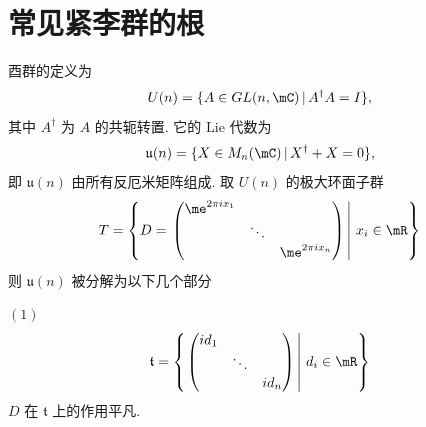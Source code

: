 \section{常见紧李群的根}
\begin{example}[酉群 $U(n)$]
    酉群的定义为
    \begin{equation*}
        U(n) = \{A\in GL(n,\mC)\,|\,A^\dagger A=I\},
    \end{equation*}
    其中 $A^\dagger$ 为 $A$ 的共轭转置. 
    它的 $\mathrm{Lie}$ 代数为
    \begin{equation*}
        \mathfrak{u}(n) = \{X\in M_{n}(\mC)\,|\,X^\dagger + X = 0\},
    \end{equation*}
    即 $\mathfrak{u}(n)$ 由所有反厄米矩阵组成.
    取 $U(n)$ 的极大环面子群
    \begin{equation*}
        T = 
        \left\{
            D = \left.
            \begin{pmatrix}
                \me^{2\pi i x_1} & & \\
                & \ddots & \\
                & & \me^{2\pi i x_n}
            \end{pmatrix} \,\right|\, x_i\in\mR
        \right\}
    \end{equation*}
    则 $\mathfrak{u}(n)$ 被分解为以下几个部分

    \noindent $(1)$ 
    \begin{equation*}
        \mathfrak{t} = 
        \left\{
            \left.
            \begin{pmatrix}
                i d_1 & & \\
                & \ddots & \\
                & & i d_n
            \end{pmatrix} \,\right|\, d_i\in\mR
        \right\}
    \end{equation*}
    $D$ 在 $\mathfrak{t}$ 上的作用平凡.


\end{example}
